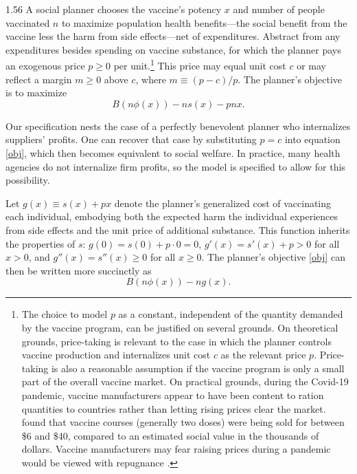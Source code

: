 \documentclass[12pt]{article}
\newcommand{\efficacy}{\phi}
\newcommand{\side}{s}
\newcommand{\general}{g}
\newcommand{\benefit}{B}
\begin{document}
\begin{spacing}{1.56}
A social planner chooses the vaccine's potency $x$ and number of
people vaccinated $n$ to maximize population health benefits---the
social benefit from the vaccine less the harm from side effects---net
of expenditures. Abstract from any expenditures besides spending on
vaccine substance, for which the planner pays an exogenous price $p
\geq 0$ per unit.\footnote{The choice to model $p$ as a constant, independent of the quantity demanded by the vaccine program, can be justified on several grounds. On theoretical grounds, price-taking is relevant to the case in which the planner controls vaccine production and internalizes unit cost $c$ as the relevant price $p$. Price-taking is also a reasonable assumption if the vaccine program is only a small part of the overall vaccine
market. On practical grounds, during the Covid-19 pandemic,
vaccine manufacturers appear to have been content to ration quantities
to countries rather than letting rising prices clear the
market. \citet{Castillo2021} found that vaccine courses (generally two doses) were being
sold for between \$6 and \$40, compared to an estimated social value in the thousands of dollars. Vaccine manufacturers may fear raising prices during a pandemic would be viewed with repugnance \citep{Roth2007}.} This price may equal unit cost $c$ or may reflect a
margin $m \geq 0$ above $c$, where $m \equiv (p-c)/p$. The planner's
objective is to maximize
\begin{equation}
\label{obj}
\benefit(n\efficacy(x)) - n \side(x) - pnx.
\end{equation}

Our specification nests the case of a perfectly benevolent planner who
internalizes suppliers' profits. One can recover that case by
substituting $p = c$ into equation \eqref{obj}, which then becomes
equivalent to social welfare.  In practice, many health agencies do
not internalize firm profits, so the model is specified to allow for
this possibility.

Let $\general(x) \equiv \side(x) + px$ denote the planner's generalized
cost of vaccinating each individual, embodying both the expected harm
the individual experiences from side effects and the unit price of
additional substance. This function inherits the properties of
$\side$: $\general(0) = \side(0) + p \cdot 0 = 0$, $\general'(x) =
\side'(x) + p > 0$ for all $x > 0$, and $\general''(x) = \side''(x)
\geq 0$ for all $x \geq 0$. The planner's objective \eqref{obj} can
then be written more succinctly as
\begin{equation}
\label{obj_g}
\benefit(n\efficacy(x)) - n \general(x).
\end{equation}


\end{spacing}
\end{document}
